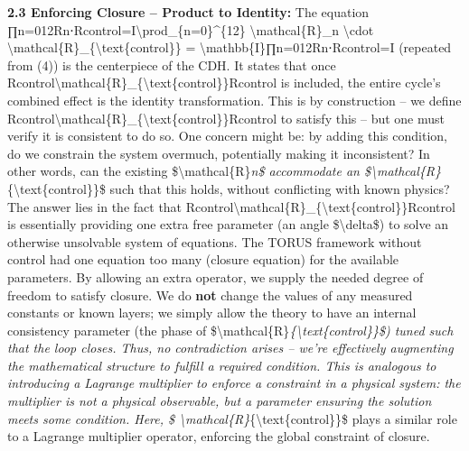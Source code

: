 \documentclass[
]{article}
\begin{document}
\textbf{2.3 Enforcing Closure -- Product to Identity:} The equation
∏n=012Rn⋅Rcontrol=I\textbackslash prod\_\{n=0\}\^{}\{12\}
\textbackslash mathcal\{R\}\_n \textbackslash cdot
\textbackslash mathcal\{R\}\_\{\textbackslash text\{control\}\} =
\textbackslash mathbb\{I\}∏n=012\hspace{0pt}Rn\hspace{0pt}⋅Rcontrol\hspace{0pt}=I
(repeated from (4\textquotesingle)) is the centerpiece of the CDH. It
states that once
Rcontrol\textbackslash mathcal\{R\}\_\{\textbackslash text\{control\}\}Rcontrol\hspace{0pt}
is included, the entire cycle's combined effect is the identity
transformation. This is by construction -- we define
Rcontrol\textbackslash mathcal\{R\}\_\{\textbackslash text\{control\}\}Rcontrol\hspace{0pt}
to satisfy this -- but one must verify it is consistent to do so. One
concern might be: by adding this condition, do we constrain the system
overmuch, potentially making it inconsistent? In other words, can the
existing \$\textbackslash mathcal\{R\}\emph{n\$ accommodate an
\$\textbackslash mathcal\{R\}}\{\textbackslash text\{control\}\}\$ such
that this holds, without conflicting with known physics? The answer lies
in the fact that
Rcontrol\textbackslash mathcal\{R\}\_\{\textbackslash text\{control\}\}Rcontrol\hspace{0pt}
is essentially providing one extra free parameter (an angle
\$\textbackslash delta\$) to solve an otherwise unsolvable system of
equations. The TORUS framework without control had one equation too many
(closure equation) for the available parameters. By allowing an extra
operator, we supply the needed degree of freedom to satisfy closure. We
do \textbf{not} change the values of any measured constants or known
layers; we simply allow the theory to have an internal consistency
parameter (the phase of
\$\textbackslash mathcal\{R\}\emph{\{\textbackslash text\{control\}\}\$)
tuned such that the loop closes. Thus, no contradiction arises -- we're
effectively augmenting the mathematical structure to fulfill a required
condition. This is analogous to introducing a Lagrange multiplier to
enforce a constraint in a physical system: the multiplier is not a
physical observable, but a parameter ensuring the solution meets some
condition. Here, \$
\textbackslash mathcal\{R\}}\{\textbackslash text\{control\}\}\$ plays a
similar role to a Lagrange multiplier operator, enforcing the global
constraint of closure.
\end{document}
